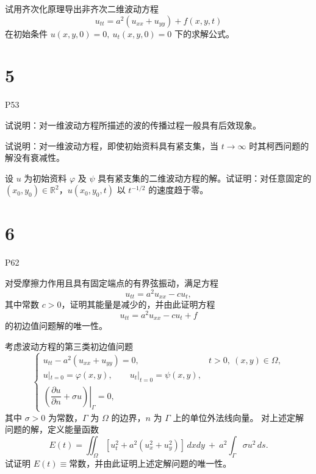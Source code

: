 \begin{homework}[6]
试用齐次化原理导出非齐次二维波动方程
\[
u_{tt}=a^{2}(u_{xx}+u_{yy})+f(x,y,t)
\]
在初始条件 $u(x,y,0)=0,\ u_t(x,y,0)=0$ 下的求解公式。
\end{homework}

\section{5}
P53
\begin{homework}[1]
试说明：对一维波动方程所描述的波的传播过程一般具有后效现象。
\end{homework}

\begin{homework}[2]
试说明：对一维波动方程，即使初始资料具有紧支集，当 $t\to\infty$ 时其柯西问题的解没有衰减性。
\end{homework}

\begin{homework}[3]
设 $u$ 为初始资料 $\varphi$ 及 $\psi$ 具有紧支集的二维波动方程的解。试证明：对任意固定的 $(x_0,y_0)\in\mathbb{R}^2$，$u(x_0,y_0,t)$ 以 $t^{-1/2}$ 的速度趋于零。
\end{homework}

\section{6}
P62
\begin{homework}[1]
对受摩擦力作用且具有固定端点的有界弦振动，满足方程
\[
u_{tt}=a^{2}u_{xx}-c u_t,
\]
其中常数 $c>0$，证明其能量是减少的，并由此证明方程
\[
u_{tt}=a^{2}u_{xx}-c u_t+f
\]
的初边值问题解的唯一性。
\end{homework}

\begin{homework}[5]
考虑波动方程的第三类初边值问题
\[
\begin{cases}
u_{tt}-a^{2}(u_{xx}+u_{yy})=0, & t>0,\ (x,y)\in\Omega,\\[4pt]
u|_{t=0}=\varphi(x,y),\qquad u_t|_{t=0}=\psi(x,y),\\[4pt]
\left.\left(\dfrac{\partial u}{\partial n}+\sigma u\right)\right|_{\Gamma}=0,
\end{cases}
\]
其中 $\sigma>0$ 为常数，$\Gamma$ 为 $\Omega$ 的边界，$n$ 为 $\Gamma$ 上的单位外法线向量。
对上述定解问题的解，定义能量函数
\[
E(t)=\iint_{\Omega}[u_t^2 + a^{2}(u_x^2+u_y^2)]\,dxdy
\ +\ a^{2}\int_{\Gamma}\sigma u^{2}\,ds.
\]
试证明 $E(t)\equiv\text{常数}$，并由此证明上述定解问题的唯一性。
\end{homework}

